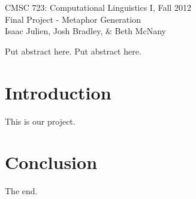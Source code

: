 \documentclass[12pt]{article}
\begin{document}
\begin{center}
CMSC 723: Computational Linguistics I, Fall 2012\\
Final Project - Metaphor Generation\\
Isaac Julien, Josh Bradley, \& Beth McNany\\
\end{center}

\begin{comment}

\texttt{[image: BreakingRules.png]}

\end{comment}

Put abstract here. Put abstract here.

\section{Introduction}
This is our project.

\section{Conclusion}
The end.
\end{document}
